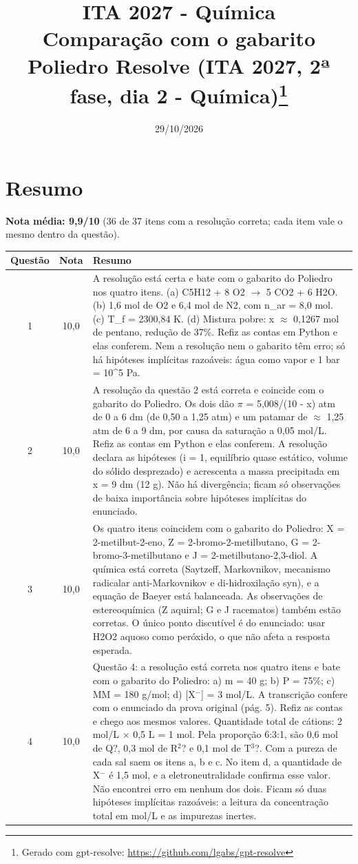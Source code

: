 \documentclass{article}%
\title{ITA 2027 {-} Química\\[4pt]\large Comparação com o gabarito Poliedro Resolve (ITA 2027, 2ª fase, dia 2 {-} Química)\thanks{Gerado com gpt-resolve: \url{https://github.com/lgabs/gpt-resolve}}}%
\date{29/10/2026}%
\begin{document}
%
\normalsize%
\maketitle%
\section*{Resumo}\textbf{Nota média: 9,9/10} (36 de 37 itens com a resolução correta; cada item vale o mesmo dentro da questão).\par\medskip%
\begin{longtable}{@{}c c p{}@{}}\toprule Questão & Nota & Resumo \\ \midrule
1 & 10,0 & A resolução está certa e bate com o gabarito do Poliedro nos quatro itens. (a) C5H12 + 8 O2 $\to$ 5 CO2 + 6 H2O. (b) 1,6 mol de O2 e 6,4 mol de N2, com n\_ar = 8,0 mol. (c) T\_f = 2300,84 K. (d) Mistura pobre: x $\approx$ 0,1267 mol de pentano, redução de 37\%. Refiz as contas em Python e elas conferem. Nem a resolução nem o gabarito têm erro; só há hipóteses implícitas razoáveis: água como vapor e 1 bar = 10\^{}5 Pa. \\
2 & 10,0 & A resolução da questão 2 está correta e coincide com o gabarito do Poliedro. Os dois dão $\pi$ = 5,008/(10 - x) atm de 0 a 6 dm (de 0,50 a 1,25 atm) e um patamar de $\approx$ 1,25 atm de 6 a 9 dm, por causa da saturação a 0,05 mol/L. Refiz as contas em Python e elas conferem. A resolução declara as hipóteses (i = 1, equilíbrio quase estático, volume do sólido desprezado) e acrescenta a massa precipitada em x = 9 dm (12 g). Não há divergência; ficam só observações de baixa importância sobre hipóteses implícitas do enunciado. \\
3 & 10,0 & Os quatro itens coincidem com o gabarito do Poliedro: X = 2{-}metilbut{-}2{-}eno, Z = 2{-}bromo{-}2{-}metilbutano, G = 2{-}bromo{-}3{-}metilbutano e J = 2{-}metilbutano{-}2,3{-}diol. A química está correta (Saytzeff, Markovnikov, mecanismo radicalar anti{-}Markovnikov e di{-}hidroxilação syn), e a equação de Baeyer está balanceada. As observações de estereoquímica (Z aquiral; G e J racematos) também estão corretas. O único ponto discutível é do enunciado: usar H2O2 aquoso como peróxido, o que não afeta a resposta esperada. \\
4 & 10,0 & Questão 4: a resolução está correta nos quatro itens e bate com o gabarito do Poliedro: a) m = 40 g; b) P = 75\%; c) MM = 180 g/mol; d) {[}X$^{-}${]} = 3 mol/L. A transcrição confere com o enunciado da prova original (pág. 5). Refiz as contas e chego aos mesmos valores. Quantidade total de cátions: 2 mol/L $\times$ 0,5 L = 1 mol. Pela proporção 6:3:1, são 0,6 mol de Q?, 0,3 mol de R$^2$? e 0,1 mol de T$^3$?. Com a pureza de cada sal saem os itens a, b e c. No item d, a quantidade de X$^{-}$ é 1,5 mol, e a eletroneutralidade confirma esse valor. Não encontrei erro em nenhum dos dois. Ficam só duas hipóteses implícitas razoáveis: a leitura da concentração total em mol/L e as impurezas inertes. \\

\end{longtable}
\end{document}
